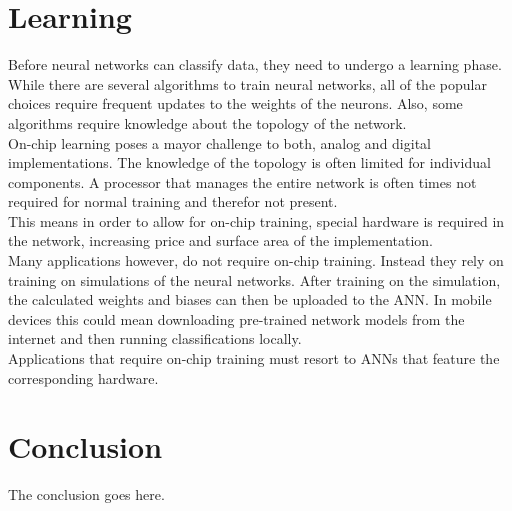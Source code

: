 \documentclass[conference]{IEEEtran}
\begin{document}
    \section{Learning}

    Before neural networks can classify data, they need to undergo a learning phase.
    While there are several algorithms to train neural networks, all of the popular choices require frequent updates to the weights of the neurons.
    Also, some algorithms require knowledge about the topology of the network.\\
    On-chip learning poses a mayor challenge to both, analog and digital implementations.
    The knowledge of the topology is often limited for individual components.
    A processor that manages the entire network is often times not required for normal training and therefor not present. \\
    This means in order to allow for on-chip training, special hardware is required in the network, increasing price and surface area of the implementation. \\
    Many applications however, do not require on-chip training.
    Instead they rely on training on simulations of the neural networks.
    After training on the simulation, the calculated weights and biases can then be uploaded to the ANN\@.
    In mobile devices this could mean downloading pre-trained network models from the internet and then running classifications locally. \\

    Applications that require on-chip training must resort to ANNs that feature the corresponding hardware.



    \section{Conclusion}
    The conclusion goes here.
\end{document}
